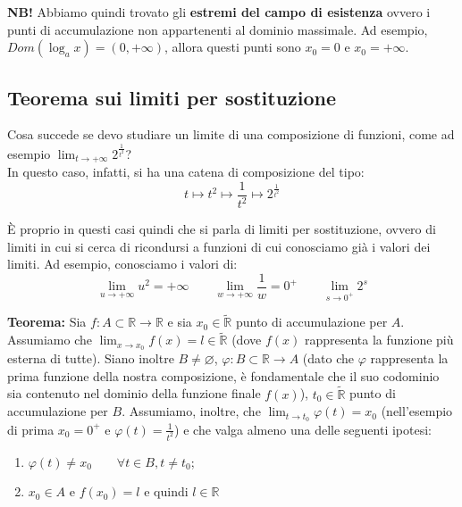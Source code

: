 \documentclass{article}
\begin{document}
\noindent\textbf{NB!} Abbiamo quindi trovato gli \textbf{estremi del campo di esistenza} ovvero i punti di accumulazione non appartenenti al dominio massimale. Ad esempio, $Dom(\log_ax) = (0, +\infty)$, allora questi punti sono $x_0 = 0$ e $x_0 = +\infty$.

\subsection{Teorema sui limiti per sostituzione}
Cosa succede se devo studiare un limite di una composizione di funzioni, come ad esempio $\lim_{t \to +\infty} 2^\frac{1}{t^2}$?\\
In questo caso, infatti, si ha una catena di composizione del tipo:
\begin{equation*}
    t \longmapsto t^2 \longmapsto \frac{1}{t^2} \longmapsto 2^\frac{1}{t^2}
\end{equation*}

\noindent È proprio in questi casi quindi che si parla di limiti per sostituzione, ovvero di limiti in cui si cerca di ricondursi a funzioni di cui conosciamo già i valori dei limiti. Ad esempio, conosciamo i valori di:
\begin{equation*}
    \lim_{u \to +\infty} u^2 = +\infty \qquad \lim_{w \to +\infty} \frac{1}{w} = 0^+ \qquad \lim_{s \to 0^+} 2^s
\end{equation*}

\noindent\textbf{Teorema:} Sia $f: A \subset \mathbb{R} \xrightarrow{} \mathbb{R}$ e sia $x_0 \in \widetilde{\mathbb{R}}$ punto di accumulazione per $A$. Assumiamo che $\lim_{x \to x_0} f(x) = l \in \widetilde{\mathbb{R}}$ (dove $f(x)$ rappresenta la funzione più esterna di tutte). Siano inoltre $B \neq \varnothing$, $\varphi: B \subset \mathbb{R} \xrightarrow{} A$ (dato che $\varphi$ rappresenta la prima funzione della nostra composizione, è fondamentale che il suo codominio sia contenuto nel dominio della funzione finale $f(x)$), $t_0 \in \widetilde{\mathbb{R}}$ punto di accumulazione per $B$. Assumiamo, inoltre, che $\lim_{t \to t_0} \varphi(t) = x_0$ (nell'esempio di prima $x_0 = 0^+$ e $\varphi(t) = \frac{1}{t^2}$) e che valga almeno una delle seguenti ipotesi:

\begin{enumerate}
    \item $\varphi(t) \neq x_0 \qquad \forall t \in B, t \neq t_0$;
    \item $x_0 \in A$ e $f(x_0) = l$ e quindi $l \in \mathbb{R}$
\end{enumerate}
\end{document}
